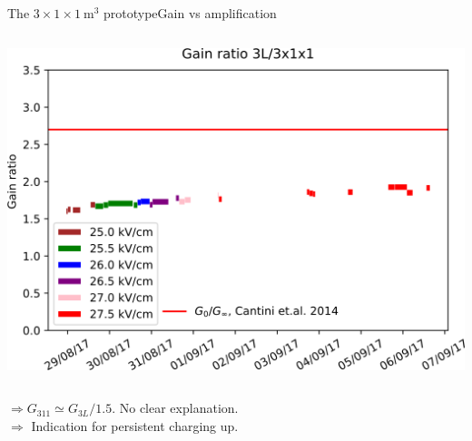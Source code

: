 \documentclass[10pt]{beamer}
\begin{document}
\begin{frame}{The \texorpdfstring{$3 \times 1 \times \SI{1}{\meter\cubed}$}{311} prototype}{Gain vs amplification}
\begin{scriptsize}
\begin{columns}
\begin{column}{0.5\textwidth}
	    			\includegraphics[width=.95\textwidth]{figures/311/ratio_vs_time.png}\\
	    		\end{column}
	    	\end{columns}
	    	$\Rightarrow G_{311} \simeq G_{3L}/1.5$. No clear explanation.\\
	    	$\Rightarrow$ Indication for persistent charging up.\\
    	\end{scriptsize}
    \end{frame}
    
\end{document}

